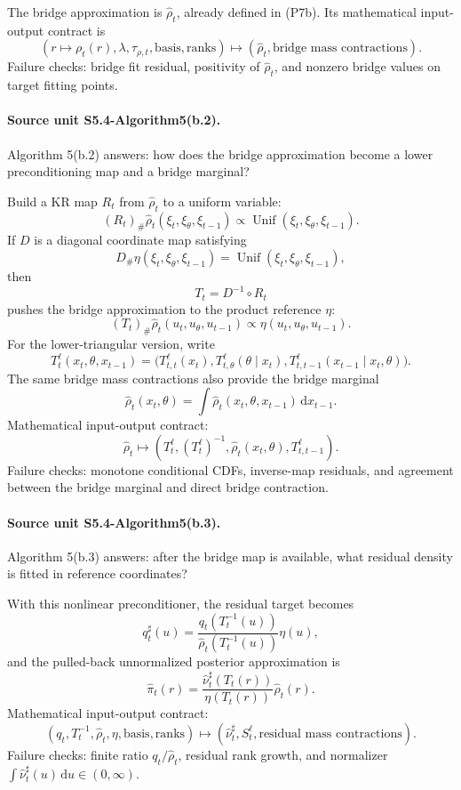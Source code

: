 \documentclass[11pt]{article}
\newcommand{\dd}{\,\mathrm d}
\begin{document}
The bridge approximation is \(\widehat\rho_t\), already defined in (P7b).  Its
mathematical input-output contract is
\[
    (r\mapsto \rho_t(r),\lambda,\tau_{\rho,t},\text{basis},\text{ranks})
    \mapsto
    (\widehat\rho_t,\text{bridge mass contractions}).
    \tag{P7l}
\]
Failure checks: bridge fit residual, positivity of \(\widehat\rho_t\), and
nonzero bridge values on target fitting points.

\paragraph{Source unit S5.4-Algorithm5(b.2).}
Algorithm 5(b.2) answers: how does the bridge approximation become a lower
preconditioning map and a bridge marginal?

Build a KR map \(R_t\) from \(\widehat\rho_t\) to a uniform variable:
\[
    (R_t)_\#\widehat\rho_t(\xi_t,\xi_\theta,\xi_{t-1})
    \propto
    \operatorname{Unif}(\xi_t,\xi_\theta,\xi_{t-1}).
    \tag{P8}
\]
If \(D\) is a diagonal coordinate map satisfying
\[
    D_\#\eta(\xi_t,\xi_\theta,\xi_{t-1})
    =
    \operatorname{Unif}(\xi_t,\xi_\theta,\xi_{t-1}),
    \tag{P9}
\]
then
\[
    T_t=D^{-1}\circ R_t
    \tag{P10}
\]
pushes the bridge approximation to the product reference \(\eta\):
\[
    (T_t)_\#\widehat\rho_t(u_t,u_\theta,u_{t-1})
    \propto
    \eta(u_t,u_\theta,u_{t-1}).
    \tag{P11}
\]
For the lower-triangular version, write
\[
    T_t^{\ell}(x_t,\theta,x_{t-1})
    =
    \bigl(
    T_{t,t}^{\ell}(x_t),
    T_{t,\theta}^{\ell}(\theta\mid x_t),
    T_{t,t-1}^{\ell}(x_{t-1}\mid x_t,\theta)
    \bigr).
    \tag{P11a}
\]
The same bridge mass contractions also provide the bridge marginal
\[
    \widehat\rho_t(x_t,\theta)
    =
    \int\widehat\rho_t(x_t,\theta,x_{t-1})\dd x_{t-1}.
    \tag{P11b}
\]
Mathematical input-output contract:
\[
    \widehat\rho_t
    \mapsto
    (T_t^\ell,(T_t^\ell)^{-1},\widehat\rho_t(x_t,\theta),
    T_{t,t-1}^\ell).
    \tag{P11c}
\]
Failure checks: monotone conditional CDFs, inverse-map residuals, and agreement
between the bridge marginal and direct bridge contraction.

\paragraph{Source unit S5.4-Algorithm5(b.3).}
Algorithm 5(b.3) answers: after the bridge map is available, what residual
density is fitted in reference coordinates?

With this nonlinear preconditioner, the residual target becomes
\[
    q^\sharp_t(u)
    =
    \frac{q_t(T_t^{-1}(u))}
    {\widehat\rho_t(T_t^{-1}(u))}
    \eta(u),
    \tag{P12}
\]
and the pulled-back unnormalized posterior approximation is
\[
    \widehat\pi_t(r)
    =
    \frac{\widehat\nu^\sharp_t(T_t(r))}
    {\eta(T_t(r))}
    \widehat\rho_t(r).
    \tag{P13}
\]
Mathematical input-output contract:
\[
    (q_t,T_t^{-1},\widehat\rho_t,\eta,\text{basis},\text{ranks})
    \mapsto
    (\widehat\nu_t^\sharp,S_t^\ell,\text{residual mass contractions}).
    \tag{P13a}
\]
Failure checks: finite ratio \(q_t/\widehat\rho_t\), residual rank growth, and
normalizer \(\int\widehat\nu_t^\sharp(u)\dd u\in(0,\infty)\).
\end{document}

